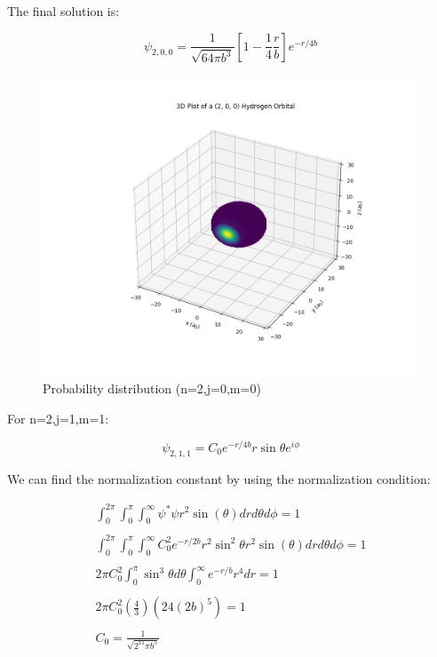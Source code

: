 The final solution is:

\begin{equation}
  \psi_{2,0,0} = \frac{1}{\sqrt{64\pi b^3}} \left[1-\frac{1}{4}\frac{r}{b}\right] e^{-r/4b}
\end{equation}



\begin{figure}[H]
  \centering
  \includegraphics{images9/3d_plot_2,0,0.png}
  \caption{Probability distribution (n=2,j=0,m=0)}
\end{figure}


For n=2,j=1,m=1:

\begin{equation}
  \psi_{2,1,1} = C_0 e^{-r/4b} r \sin\theta e^{i\phi}
\end{equation}

We can find the normalization constant by using the normalization condition:

\begin{equation}
\begin{array}{c}
  \int_{0}^{2\pi}\int_{0}^{\pi}\int_{0}^{\infty} \psi^*\psi r^2 \sin(\theta) dr d\theta d\phi = 1
  \\

  \\
  \int_{0}^{2\pi}\int_{0}^{\pi}\int_{0}^{\infty} C_0^2 e^{-r/2b} r^2 \sin^2\theta r^2 \sin(\theta) dr d\theta d\phi = 1
  \\

  \\
  2 \pi C_0^2\int_{0}^{\pi}\sin^3\theta d\theta \int_{0}^{\infty} e^{-r/b} r^4 dr = 1
  \\

  \\
  2 \pi C_0^2 (\frac{4}{3}) (24(2b)^5) = 1
  \\

  \\
  C_0 = \frac{1}{\sqrt{2^{11}\pi b^5}}
\end{array}
\end{equation}

